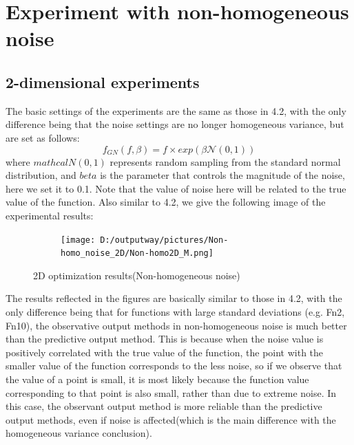\documentclass{article}
\begin{document}
\section{Experiment with non-homogeneous noise}
\subsection{2-dimensional experiments}
The basic settings of the experiments are the same as those in 4.2, with the only difference being that the noise settings are no longer homogeneous variance, but are set as follows:
\begin{equation}\label{eq12}
	f_{GN}(f,\beta) = f \times exp(\beta\mathcal{N}(0,1)) 
\end{equation}
where $mathcal{N}(0,1)$ represents random sampling from the standard normal distribution, and $beta$ is the parameter that controls the magnitude of the noise, here we set it to 0.1. Note that the value of noise here will be related to the true value of the function. Also similar to 4.2, we give the following image of the experimental results:

\begin{figure}[H]
    \centering
    \begin{subfigure}[t]{1\linewidth}
        \centering
        \texttt{[image: D:/outputway/pictures/Non-homo\_noise\_2D/Non-homo2D\_M.png]}
    \end{subfigure}
    \caption{2D optimization results(Non-homogeneous noise)}
    \label{Fig10}
\end{figure}

\hspace{2em}The results reflected in the figures are basically similar to those in 4.2, with the only difference being that for functions with large standard deviations (e.g. Fn2, Fn10), the observative output methods in non-homogeneous noise is much better than the predictive output method. This is because when the noise value is positively correlated with the true value of the function, the point with the smaller value of the function corresponds to the less noise, so if we observe that the value of a point is small, it is most likely because the function value corresponding to that point is also small, rather than due to extreme noise. In this case, the observant output method is more reliable than the predictive output methods, even if noise is affected(which is the main difference with the homogeneous variance conclusion).
\end{document}
